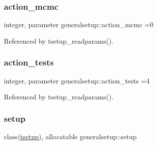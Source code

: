 \subsubsection{\texorpdfstring{action\+\_\+mcmc}{action\_mcmc}}
{\footnotesize\ttfamily integer, parameter generalsetup\+::action\+\_\+mcmc =0}



Referenced by tsetup\+\_\+readparams().

\mbox{\label{namespacegeneralsetup_a6f10f3082af438a30e6188d4b75666de}} 
\subsubsection{\texorpdfstring{action\+\_\+tests}{action\_tests}}
{\footnotesize\ttfamily integer, parameter generalsetup\+::action\+\_\+tests =4}



Referenced by tsetup\+\_\+readparams().

\mbox{\label{namespacegeneralsetup_a9910f6f4ebbc88805bed3c999d7ce459}} 
\subsubsection{\texorpdfstring{setup}{setup}}
{\footnotesize\ttfamily class(\mbox{\hyperlink{structgeneralsetup_1_1tsetup}{tsetup}}), allocatable generalsetup\+::setup}

